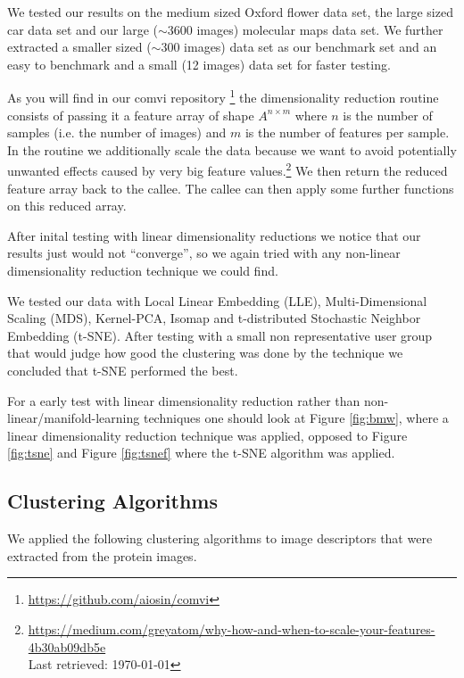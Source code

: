 \documentclass[journal]{vgtc}       %
\begin{document}
We tested our results on the medium sized Oxford flower data set\cite{flower}, the large sized car  data set \cite{stanfordcar} and our large ($\sim$3600 images) molecular maps data set. 
We further extracted a smaller sized ($\sim$300 images) data set as our benchmark set  and an easy to benchmark and a small (12 images) data set for faster testing. 

As you will find in our comvi repository \footnote{\url{https://github.com/aiosin/comvi}} the dimensionality reduction routine consists of passing it a feature array of shape \(A^{n\times m}\) where \(n\) is the number of samples (i.e. the number of images) and \(m\) is the number of features per sample.
In the routine we additionally scale the data because we want to avoid potentially unwanted effects caused by very big feature values.\footnote{\url{https://medium.com/greyatom/why-how-and-when-to-scale-your-features-4b30ab09db5e} \\ Last retrieved: \today}
We then return the reduced feature array back to the callee. The callee can then apply some  further  functions on this reduced array.

After inital testing with linear dimensionality reductions we notice that our results just would not ``converge'', so we again tried with any non-linear dimensionality reduction technique we could find.

We tested our data with Local Linear Embedding (LLE), Multi-Dimensional Scaling (MDS), Kernel-PCA, Isomap and t-distributed Stochastic Neighbor Embedding (t-SNE).
After testing with a small non representative user group that would judge how good the clustering was done by the technique we concluded that t-SNE performed the best.

For a early test with linear dimensionality reduction rather than non-linear/manifold-learning techniques one should look at Figure \ref{fig:bmw}, where a linear dimensionality reduction technique was applied, opposed to Figure \ref{fig:tsne} and Figure \ref{fig:tsnef} where the t-SNE algorithm was applied.


\subsection{Clustering Algorithms}\label{sec:clusteringa}
We applied the following clustering algorithms to image descriptors that were extracted from the protein images.
\end{document}

